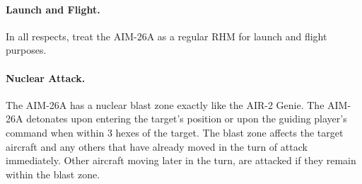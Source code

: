 \begin{advancedrules}
\paragraph{Launch and Flight.} In all respects, treat the AIM-26A as a regular RHM for launch and flight purposes.

\paragraph{Nuclear Attack.} The AIM-26A has a nuclear blast zone exactly like the AIR-2 Genie. The AIM-26A detonates upon entering the target's position or upon the guiding player's command when within 3 hexes of the target. The blast zone affects the target aircraft and any others that have already moved in the turn of attack immediately. Other aircraft moving later in the turn, are attacked if they remain within the blast zone.

\end{advancedrules}
